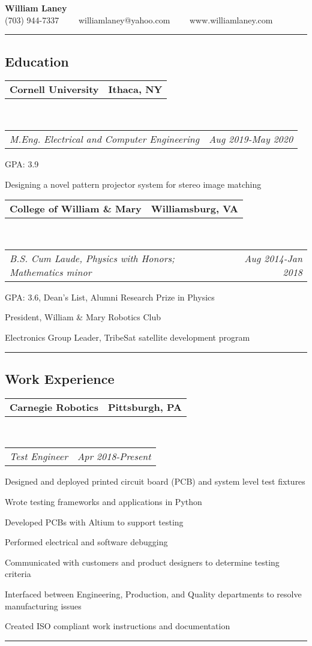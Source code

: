 \documentclass[10pt,letterpaper]{article}
\makeatletter
\newcommand{\headerrow}[2]
{\begin{tabular*}{\linewidth}{l@{\extracolsep{\fill}}r}
	#1 &
	#2 \\
\end{tabular*}}
\makeatother
\begin{document}
\begin{center}
{\LARGE \textbf{William Laney}}\\
\vspace{0.1em}
(703) 944-7337\ \ \textbullet
\ \ williamlaney@yahoo.com\ \ \textbullet
\ \ www.williamlaney.com
\end{center}

\hrule
\vspace{-0.4em}
\subsection*{Education}
	\headerrow
		{\textbf{Cornell University}}
		{\textbf{Ithaca, NY}}
		\\
	\headerrow
		{\emph{M.Eng. Electrical and Computer Engineering}}
		{\emph{Aug 2019-May 2020}}
	\begin{itemize*}
		\item GPA: 3.9
		\item Designing a novel pattern projector system for stereo image matching
	\end{itemize*}
	\headerrow
		{\textbf{College of William \& Mary}}
		{\textbf{Williamsburg, VA}}
	\\
	\headerrow
		{\emph{B.S. Cum Laude, Physics with Honors; Mathematics minor}}
		{\emph{Aug 2014-Jan 2018}}
	\begin{itemize*}
		\item GPA: 3.6, Dean's List, Alumni Research Prize in Physics
		\item President, William \& Mary Robotics Club
		\item Electronics Group Leader, TribeSat satellite development program
	\end{itemize*}


\hrule
\vspace{-0.4em}
\subsection*{Work Experience}
\headerrow
		{\textbf{Carnegie Robotics}}
		{\textbf{Pittsburgh, PA}}
	\\
	\headerrow
		{\emph{Test Engineer}}
		{\emph{Apr 2018-Present}}
	\begin{itemize*}
		\item Designed and deployed printed circuit board (PCB) and system level test fixtures
		\item Wrote testing frameworks and applications in Python		
		\item Developed PCBs with Altium to support testing
		\item Performed electrical and software debugging
		\item Communicated with customers and product designers to determine testing criteria
		\item Interfaced between Engineering, Production, and Quality departments to resolve manufacturing issues
		\item Created ISO compliant work instructions and documentation
	\end{itemize*}
\hrule
\vspace{-0.4em}
\end{document}
